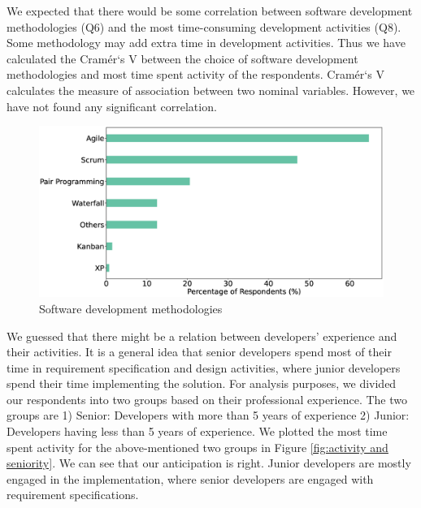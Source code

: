 We expected that there would be some correlation between software development methodologies (Q6) and the most time-consuming development activities (Q8). Some methodology may add extra time in development activities. Thus we have calculated the Cramér`s V \cite{Cramer1946} between the choice of software development methodologies and most time spent activity of the respondents. Cramér`s V calculates the measure of association between two nominal variables\cite{Sheskin2007}. However, we have not found any significant correlation.

\begin{figure}[h]
\centering
  \includegraphics[scale=0.18]{Figures/Respondents_Methodology}
  \caption{Software development methodologies}
  \label{fig:methodologies}
\end{figure}

We guessed that there might be a relation between developers' experience and their activities. It is a general idea that senior developers spend most of their time in requirement specification and design activities, where junior developers spend their time implementing the solution. For analysis purposes, we divided our respondents into two groups based on their professional experience. The two groups are 1) Senior: Developers with more than 5 years of experience 2) Junior: Developers having less than 5 years of experience. We plotted the most time spent activity for the above-mentioned two groups in Figure \ref{fig:activity and seniority}. We can see that our anticipation is right. Junior developers are mostly engaged in the implementation, where senior developers are engaged with requirement specifications.

